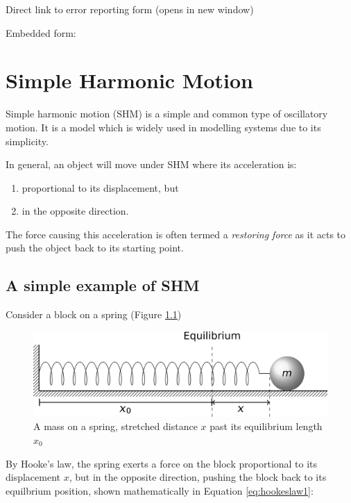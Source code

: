 \documentclass[
]{book}
\providecommand{\tightlist}{%
  \setlength{\itemsep}{0pt}\setlength{\parskip}{0pt}}
\begin{document}
Direct link to error reporting form (opens in new window)

Embedded form:

\hypertarget{sec:shm}{%
\chapter{Simple Harmonic Motion}\label{sec:shm}}

Simple harmonic motion (SHM) is a simple and common type of oscillatory motion. It is a model which is widely used in modelling systems due to its simplicity.

In general, an object will move under SHM where its acceleration is:

\begin{enumerate}
\def\labelenumi{\arabic{enumi}.}
\tightlist
\item
  proportional to its displacement, but
\item
  in the opposite direction.
\end{enumerate}

The force causing this acceleration is often termed a \emph{restoring force} as it acts to push the object back to its starting point.

\hypertarget{sec:ch1-simpleshmexample}{%
\section{A simple example of SHM}\label{sec:ch1-simpleshmexample}}

Consider a block on a spring (Figure \ref{fig:ch1-blockonspring1})

\begin{figure}

{\centering \includegraphics[width=0.7\linewidth]{visualisations/LaTeX/ch1-blockonspring1} 

}

\caption{A mass on a spring, stretched distance $x$ past its equilibrium length $x_0$}\label{fig:ch1-blockonspring1}
\end{figure}

By Hooke's law, the spring exerts a force on the block proportional to its displacement \(x\), but in the opposite direction, pushing the block back to its equilbrium position, shown mathematically in Equation \eqref{eq:hookeslaw1}:
\end{document}
